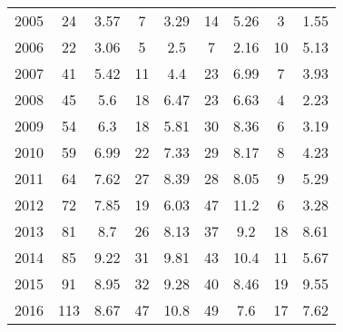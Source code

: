 \begin{table}[htbp]
\begin{tabular}{l*{8}{c}}
2005      &       24&     3.57&        7&     3.29&       14&     5.26&        3&     1.55\\
2006      &       22&     3.06&        5&      2.5&        7&     2.16&       10&     5.13\\
2007      &       41&     5.42&       11&      4.4&       23&     6.99&        7&     3.93\\
2008      &       45&      5.6&       18&     6.47&       23&     6.63&        4&     2.23\\
2009      &       54&      6.3&       18&     5.81&       30&     8.36&        6&     3.19\\
2010      &       59&     6.99&       22&     7.33&       29&     8.17&        8&     4.23\\
2011      &       64&     7.62&       27&     8.39&       28&     8.05&        9&     5.29\\
2012      &       72&     7.85&       19&     6.03&       47&     11.2&        6&     3.28\\
2013      &       81&      8.7&       26&     8.13&       37&      9.2&       18&     8.61\\
2014      &       85&     9.22&       31&     9.81&       43&     10.4&       11&     5.67\\
2015      &       91&     8.95&       32&     9.28&       40&     8.46&       19&     9.55\\
2016      &      113&     8.67&       47&     10.8&       49&      7.6&       17&     7.62\\
\hline\hline
\end{tabular}
\end{table}
